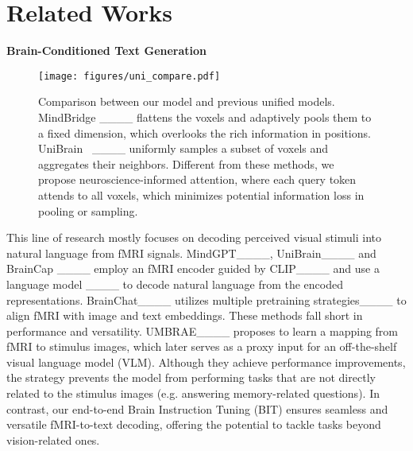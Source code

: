 \section{Related Works}
\noindent\textbf{Brain-Conditioned Text Generation}
\begin{figure}
    \centering
    \texttt{[image: figures/uni\_compare.pdf]}
    \vspace{-2em}
    \caption{Comparison between our model and previous unified models. MindBridge ____ flattens the voxels and adaptively pools them to a fixed dimension, which overlooks the rich information in positions. UniBrain~ ____ uniformly samples a subset of voxels and aggregates their neighbors. Different from these methods, we propose neuroscience-informed attention, where each query token attends to all voxels, which minimizes potential information loss in pooling or sampling.}
    \label{fig:uni_compare}
    \vspace{-1em}
\end{figure}
This line of research mostly focuses on decoding perceived visual stimuli into natural language from fMRI signals. MindGPT____, UniBrain____ and BrainCap ____ employ an fMRI encoder guided by CLIP____ and use a language model ____ to decode natural language from the encoded representations. BrainChat____ utilizes multiple pretraining strategies____ to align fMRI with image and text embeddings. These methods fall short in performance and versatility. UMBRAE____ proposes to learn a mapping from fMRI to stimulus images, which later serves as a proxy input for an off-the-shelf visual language model (VLM). Although they achieve performance improvements, the strategy prevents the model from performing tasks that are not directly related to the stimulus images (e.g. answering memory-related questions). In contrast, our end-to-end Brain Instruction Tuning (BIT) ensures seamless and versatile fMRI-to-text decoding, offering the potential to tackle tasks beyond vision-related ones.

